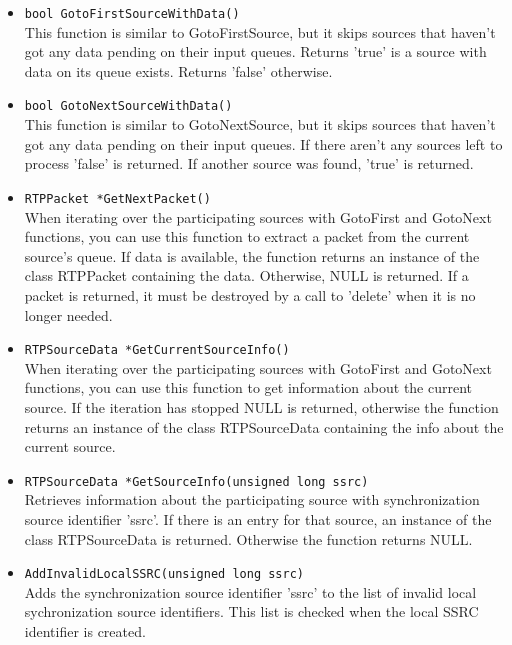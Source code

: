 \begin{itemize}
\item {\tt bool GotoFirstSourceWithData()}\\
	This function is similar to GotoFirstSource, but it skips sources
	that haven't got any data pending on their input queues. Returns
	'true' is a source with data on its queue exists. Returns 'false'
	otherwise.

\item {\tt bool GotoNextSourceWithData()}\\
	This function is similar to GotoNextSource, but it skips sources
	that haven't got any data pending on their input queues. If there
	aren't any sources left to process 'false' is returned. If another
	source was found, 'true' is returned.

\item {\tt RTPPacket *GetNextPacket()}\\
	When iterating over the participating sources with GotoFirst and
	GotoNext functions, you can use this function to extract a packet
	from the current source's queue. If data is available, the function
	returns an instance of the class RTPPacket containing the data.
	Otherwise, NULL is returned. If a packet is returned, it must be
	destroyed by a call to 'delete' when it is no longer needed.

\item {\tt RTPSourceData *GetCurrentSourceInfo()}\\
	When iterating over the participating sources with GotoFirst and
	GotoNext functions, you can use this function to get information
	about the current source. If the iteration has stopped NULL is
	returned, otherwise the function returns an instance of the class
	RTPSourceData containing the info about the current source.

\item {\tt RTPSourceData *GetSourceInfo(unsigned long ssrc)}\\
	Retrieves information about the participating source with
	synchronization source identifier 'ssrc'. If there is an entry for
	that source, an instance of the class RTPSourceData is returned.
	Otherwise the function returns NULL.

\item {\tt AddInvalidLocalSSRC(unsigned long ssrc)}\\
	Adds the synchronization source identifier 'ssrc' to the list of
	invalid local sychronization source identifiers. This list is checked
	when the local SSRC identifier is created.


\end{itemize}
